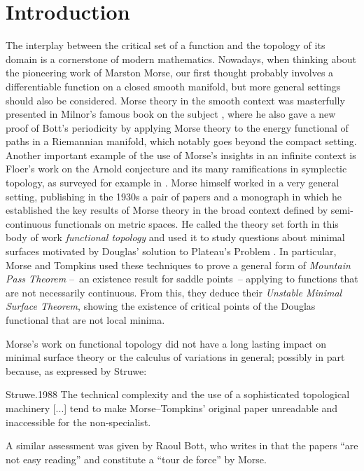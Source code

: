 
\section{Introduction}

The interplay between the critical set of a function and the topology of its domain is a cornerstone of modern mathematics.
Nowadays, when thinking about the pioneering work of Marston Morse, our first thought probably involves a differentiable function on a closed smooth manifold, but more general settings should also be considered.
Morse theory in the smooth context was masterfully presented in Milnor's famous book on the subject \cite{Milnor.1963}, where he also gave a new proof of Bott's periodicity by applying Morse theory to the energy functional of paths in a Riemannian manifold, which notably goes beyond the compact setting.
Another important example of the use of Morse's insights in an infinite context is Floer's work on the Arnold conjecture and its many ramifications in symplectic topology, as surveyed for example in \cite{Salamon.1999}.
Morse himself worked in a very general setting, publishing in the 1930s a pair of papers \cite{Morse.1937, Morse.1940} and a monograph \cite{Morse.1938} in which he established the key results of Morse theory in the broad context defined by semi-continuous functionals on metric spaces.
He called the theory set forth in this body of work \emph{functional topology} and used it to study questions about minimal surfaces motivated by Douglas' solution to Plateau’s Problem \cite{Douglas.1931}.
In particular, Morse and Tompkins \cite{Morse.1939, Morse.1941} used these techniques to prove a general form of \emph{Mountain Pass Theorem} --~an existence result for saddle points~-- applying to functions that are not necessarily continuous.
From this, they deduce their \emph{Unstable Minimal Surface Theorem}, showing the existence of critical points of the Douglas functional that are not local minima.

Morse's work on functional topology did not have a long lasting impact on minimal surface theory or the calculus of variations in general; possibly in part because, as expressed by Struwe:
\begin{displaycquote}[p.~82]{Struwe.1988}
	The technical complexity and the use of a sophisticated topological machinery [...] tend to make Morse--Tompkins' original paper unreadable and inaccessible for the non-specialist.
\end{displaycquote}
A similar assessment was given by Raoul Bott, who writes in \cite[p.~934]{Bott.1980} that the papers \cite{Morse.1937, Morse.1940} ``are not easy reading'' and constitute a ``tour de force'' by Morse.

